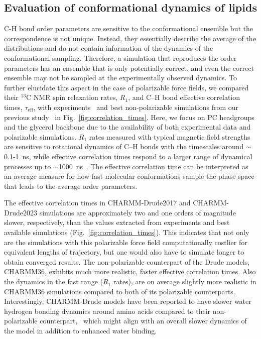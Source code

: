 \documentclass[journal=jctcce,manuscript=article,layout=singlecolumn]{achemso}
\begin{document}
\subsection{Evaluation of conformational dynamics of lipids}
C-H bond order parameters are sensitive to the conformational ensemble but the correspondence is not unique. Instead, they essentially describe the average of the distributions and do not contain information of the dynamics of the conformational sampling. Therefore, a simulation that reproduces the order parameters has an ensemble that is only potentially correct, and even the correct ensemble may not be sampled at the experimentally observed dynamics. To further elucidate this aspect in the case of polarizable force fields, we compared their $^{13}$C NMR spin relaxation rates, $R_{1}$, and C--H bond effective correlation times, $\tau_{\mathrm{eff}}$, with experiments~\cite{ferreira15} and best non-polarizable simulations from our previous study~\cite{Antila2021} in Fig.~\ref{fig:correlation_times}. Here, we focus on PC headgroups and the glycerol backbone due to the availability of both experimental data and polarizable simulations. $R_{1}$ rates measured with typical magnetic field strengths are sensitive to rotational dynamics of C--H bonds with the timescales around $\sim$0.1-1~ns, while effective correlation times respond to a larger range of dynamical processes up to $\sim$1000~ns~\cite{ferreira15}. The effective correlation time can be interpreted as an average measure for how fast molecular conformations sample the phase space that leads to the average order parameters.

The effective correlation times in CHARMM-Drude2017 and CHARMM-Drude2023 simulations are approximately two and one orders of magnitude slower, respectively, than the values extracted from experiments and best available simulations (Fig.~\ref{fig:correlation_times}). This indicates that not only are the simulations with this polarizable force field computationally costlier for equivalent lengths of trajectory, but one would also have to simulate longer to obtain converged results. The non-polarizable counterpart of the Drude models, CHARMM36, exhibits much more realistic, faster effective correlation times. Also the dynamics in the fast range ($R_{1}$ rates), are on average slightly more realistic in CHARMM36 simulations compared to both of its polarizable counterparts. Interestingly, CHARMM-Drude models have been reported to have slower water hydrogen bonding dynamics around amino acids compared to their non-polarizable counterpart,~\cite{Ngo2019} which might align with an overall slower dynamics of the model in addition to enhanced water binding. 
\end{document}

